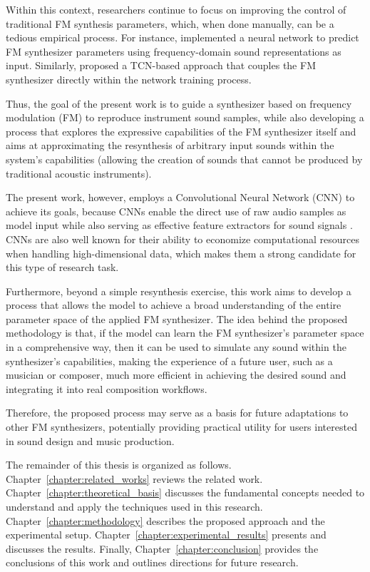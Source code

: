 Within this context, researchers continue to focus on improving the control of traditional FM synthesis parameters, which, when done manually, can be a tedious empirical process. For instance, \textcite{claesson2021resynthesis} implemented a neural network to predict FM synthesizer parameters using frequency-domain sound representations as input. Similarly, \textcite{steinmetz2022ddx7} proposed a TCN-based approach that couples the FM synthesizer directly within the network training process.

Thus, the goal of the present work is to guide a synthesizer based on frequency modulation (FM) to reproduce instrument sound samples, while also developing a process that explores the expressive capabilities of the FM synthesizer itself and aims at approximating the resynthesis of arbitrary input sounds within the system's capabilities (allowing the creation of sounds that cannot be produced by traditional acoustic instruments).

The present work, however, employs a Convolutional Neural Network (CNN) to achieve its goals, because CNNs enable the direct use of raw audio samples as model input while also serving as effective feature extractors for sound signals \textcite{kiranyaz2021survey}. CNNs are also well known for their ability to economize computational resources when handling high-dimensional data, which makes them a strong candidate for this type of research task.

Furthermore, beyond a simple resynthesis exercise, this work aims to develop a process that allows the model to achieve a broad understanding of the entire parameter space of the applied FM synthesizer. The idea behind the proposed methodology is that, if the model can learn the FM synthesizer’s parameter space in a comprehensive way, then it can be used to simulate any sound within the synthesizer’s capabilities, making the experience of a future user, such as a musician or composer, much more efficient in achieving the desired sound and integrating it into real composition workflows.

Therefore, the proposed process may serve as a basis for future adaptations to other FM synthesizers, potentially providing practical utility for users interested in sound design and music production.

The remainder of this thesis is organized as follows. Chapter~\ref{chapter:related_works} reviews the related work. Chapter~\ref{chapter:theoretical_basis} discusses the fundamental concepts needed to understand and apply the techniques used in this research. Chapter~\ref{chapter:methodology} describes the proposed approach and the experimental setup. Chapter~\ref{chapter:experimental_results} presents and discusses the results. Finally, Chapter~\ref{chapter:conclusion} provides the conclusions of this work and outlines directions for future research.
